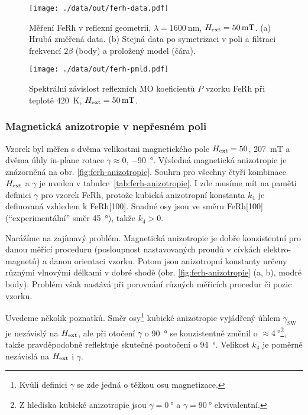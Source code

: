 \begin{figure}[htbp]
    \centering
    \texttt{[image: ./data/out/ferh-data.pdf]}
    \caption{Měření FeRh v reflexní geometrii, $\lambda=\SI{1600}{\nano\meter}$, $H_\textrm{ext}=\SI{50}{\milli\tesla}$. (a) Hrubá změřená data. (b) Stejná data po symetrizaci v poli a filtraci frekvencí $2\beta$ (body) a proložený model (čára).}
    \label{fig:ferh-fm-schema-data}
\end{figure}

\begin{figure}[htbp]
    \centering
    \texttt{[image: ./data/out/ferh-pmld.pdf]}
    \caption{Spektrální závislost reflexních MO koeficientů $P$ vzorku FeRh při teplotě \SI{420}{\kelvin}, $H_\textrm{ext}=\SI{50}{\milli\tesla}$.}
    \label{fig:ferh-fm-pmld}
\end{figure}

\subsubsection*{Magnetická anizotropie v nepřesném poli}

Vzorek byl měřen s dvěma velikostmi magnetického pole $H_\textrm{ext}=50$, \SI{207}{\milli\tesla} a dvěma úhly in-plane rotace $\gamma\approx0$, \SI{-90}{\degree}.
Výsledná magnetická anizotropie je znázorněná na obr. \ref{fig:ferh-anizotropie}.
Souhrn pro všechny čtyři kombinace $H_\textrm{ext}$ a $\gamma$ je uveden v tabulce~\ref{tab:ferh-anizotropie}.
I zde musíme mít na paměti definici $\gamma$ pro vzorek FeRh, protože kubická anizotropní konstanta $k_4$ je definovaná vzhledem k FeRh[100].
Snadné osy jsou ve směru FeRh[100] (``experimentální'' směr \SI{45}{\degree}), takže $k_4>0$.

Narážíme na zajímavý problém.
Magnetická anizotropie je dobře konzistentní pro danou měřící proceduru (posloupnost nastavovaných proudů v cívkách elektro-magnetů) a danou orientaci vzorku.
Potom jsou anizotropní konstanty určeny různými vlnovými délkami v dobré shodě (obr. \ref{fig:ferh-anizotropie} (a, b), modré body).
Problém však nastává při porovnání různých měřicích procedur či pozic vzorku.

Uvedeme několik poznatků.
Směr osy\footnote{Kvůli definici $\gamma$ se zde jedná o těžkou osu magnetizace.} kubické anizotropie vyjádřený úhlem $\gamma_\textrm{SW}$ je nezávislý na $H_\textrm{ext}$, ale při otočení $\gamma$ o \SI{90}{\degree} se konzistentně změnil o $\approx\SI{4}{\degree}$\footnote{Z hlediska kubické anizotropie jsou $\gamma=\SI{0}{\degree}$ a $\gamma=\SI{90}{\degree}$ ekvivalentní.}, takže pravděpodobně reflektuje skutečné pootočení o \SI{94}{\degree}.
Velikost $k_4$ je poměrně nezávislá na $H_\textrm{ext}$ i $\gamma$.

